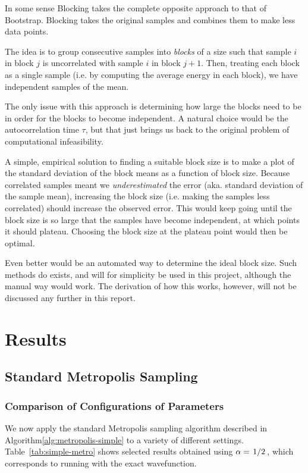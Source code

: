 \documentclass[twocolumn]{article}
\begin{document}
In some sense Blocking takes the complete opposite approach to that of
Bootstrap. Blocking takes the original samples and combines them to make less
data points.

The idea is to group consecutive samples into \textit{blocks} of a size such
that sample $i$ in block $j$ is uncorrelated with sample $i$ in block $j+1$.
Then, treating each block as a single sample (i.e. by computing the average
energy in each block), we have independent samples of the mean. 

The only issue with this approach is determining how large the blocks need to be
in order for the blocks to become independent. A natural choice would be the
autocorrelation time $\tau$, but that just brings us back to the original
problem of computational infeasibility.

A simple, empirical solution to finding a suitable block size is to make a plot
of the standard deviation of the block means as a function of block
size. Because correlated samples meant we \textit{underestimated} the error (aka.
standard deviation of the sample mean), increasing the block size (i.e. making the
samples less correlated) should increase the observed error. This would keep
going until the block size is so large that the samples have become independent,
at which points it should plateau. Choosing the block size at the plateau point
would then be optimal.

Even better would be an automated way to determine the ideal block size. Such
methods do exists, and will for simplicity be used in this project, although the
manual way would work. The derivation of how this
works, however, will not be discussed any further in this report.


\section{Results}

\subsection{Standard Metropolis Sampling}

\subsubsection{Comparison of Configurations of Parameters}

We now apply the standard Metropolis sampling algorithm described in 
Algorithm\ref{alg:metropolis-simple} to a variety of different settings.
Table~\ref{tab:simple-metro} shows selected results obtained using
$\alpha=\flatfrac{1}{2}$, which corresponds to running with the exact
wavefunction. 
\end{document}
